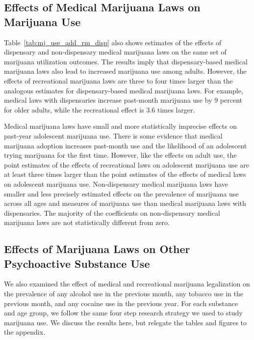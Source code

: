 \documentclass[12pt]{article}%
\begin{document}
\subsection{Effects of Medical Marijuana Laws on Marijuana Use}
\label{sec:results_medical}

Table~\ref{tab:mj_use_add_rm_disp} also shows estimates of the effects of dispensary and non-dispensary medical marijuana laws on the same set of marijuana utilization outcomes. The results imply that dispensary-based medical marijuana laws also lead to increased marijuana use among adults. However, the effects of recreational marijuana laws are three to four times larger than the analogous estimates for dispensary-based medical marijuana laws. For example, medical laws with dispensaries increase past-month marijuana use by 9 percent for older adults, while the recreational effect is 3.6 times larger. 


Medical marijuana laws have small and more statistically imprecise effects on past-year adolescent marijuana use. There is some evidence that medical marijuana adoption increases past-month use and the likelihood of an adolescent trying marijuana for the first time. However, like the effects on adult use, the point estimates of the effects of recreational laws on adolescent marijuana use are at least three times larger than the point estimates of the effects of medical laws on adolescent marijuana use. Non-dispensary medical marijuana laws have smaller and less precisely estimated effects on the prevalence of marijuana use across all ages and measures of marijuana use than medical marijuana laws with dispensaries. The majority of the coefficients on non-dispensary medical marijuana laws are not statistically different from zero. 


\subsection{Effects of Marijuana Laws on Other Psychoactive Substance Use}
\label{sec:results_other}

We also examined the effect of medical and recreational marijuana legalization on the prevalence of any alcohol use in the previous month, any tobacco use in the previous month, and any cocaine use in the previous year. For each substance and age group, we follow the same four step research strategy we used to study marijuana use. We discuss the results here, but relegate the tables and figures to the appendix.
\end{document}
